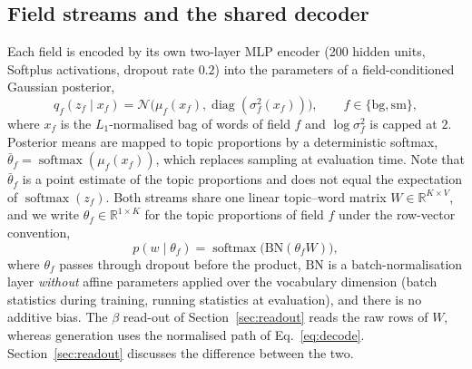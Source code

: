 \documentclass[pdflatex,sn-basic]{sn-jnl}
\begin{document}
\subsection{Field streams and the shared decoder}
Each field is encoded by its own two-layer MLP encoder (200 hidden units, Softplus activations,
dropout rate $0.2$) into the parameters of a field-conditioned Gaussian posterior,
\begin{equation}
q_f(z_f\mid x_f)=\mathcal N\big(\mu_f(x_f),\operatorname{diag}(\sigma_f^2(x_f))\big),
\qquad f\in\{\mathrm{bg},\mathrm{sm}\},
\label{eq:posterior}
\end{equation}
where $x_f$ is the $L_1$-normalised bag of words of field $f$ and $\log\sigma_f^2$ is capped at
$2$. Posterior means are mapped to topic proportions by a deterministic softmax,
$\bar\theta_f=\operatorname{softmax}(\mu_f(x_f))$, which replaces sampling at evaluation time.
Note that $\bar\theta_f$ is a point estimate of the topic proportions and does not equal the
expectation of $\operatorname{softmax}(z_f)$. Both streams share one linear topic--word matrix
$W\in\mathbb{R}^{K\times V}$, and we write $\theta_f\in\mathbb{R}^{1\times K}$ for the topic
proportions of field $f$ under the row-vector convention,
\begin{equation}
p(w\mid\theta_f)=\operatorname{softmax}\!\big(\mathrm{BN}(\theta_f W)\big),
\label{eq:decode}
\end{equation}
where $\theta_f$ passes through dropout before the product, $\mathrm{BN}$ is a batch-normalisation
layer \emph{without} affine parameters applied over the vocabulary dimension (batch statistics
during training, running statistics at evaluation), and there is no additive bias. The $\beta$
read-out of Section~\ref{sec:readout} reads the raw rows of $W$, whereas generation uses the
normalised path of Eq.~\eqref{eq:decode}. Section~\ref{sec:readout} discusses the difference
between the two.
\end{document}
